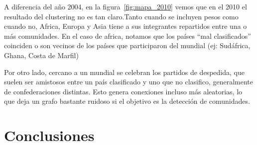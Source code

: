 \documentclass{article}
\begin{document}
A diferencia del año 2004, en la figura~\ref{fig:mapa_2010} vemos que en el 2010 el resultado del clustering no es tan claro.Tanto cuando se incluyen pesos como cuando no, Africa, Europa y Asia tiene a sus integrantes
repartidos entre una o más comunidades. En el caso de africa, notamos que los países ``mal clasificados''
coinciden o son vecinos de los países que participaron del mundial (ej: Sudáfrica, Ghana, Costa de Marfil)

Por otro lado, cercano a un mundial se celebran los partidos de despedida, que suelen ser amistosos entre
un país clasificado y uno que no clasifico, generalmente de confederaciones distintas. Esto genera 
conexiones incluso más aleatorias, lo que deja un grafo bastante ruidoso si el objetivo es la detección
de comunidades.


\section{Conclusiones}

\FloatBarrier


\end{document}
